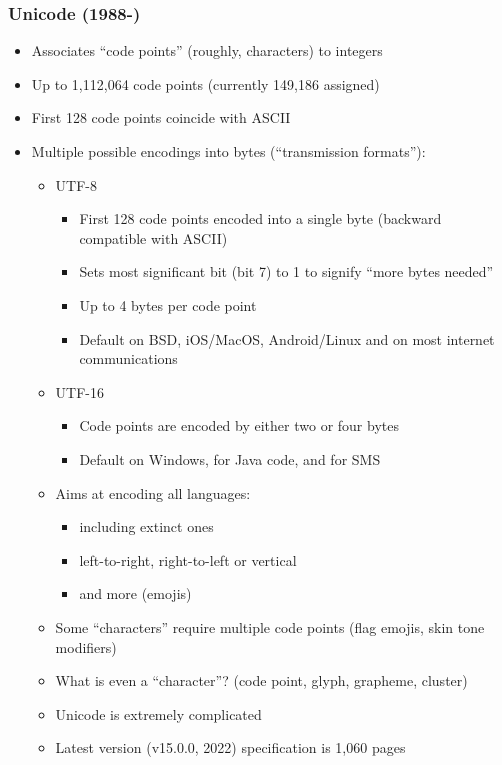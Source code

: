 \documentclass[12pt]{article}
\begin{document}
\subsubsection{Unicode (1988-)}
\begin{itemize}
    \item Associates ``code points'' (roughly, characters) to integers
    \item Up to 1,112,064 code points (currently 149,186 assigned)
    \item First 128 code points coincide with ASCII
    \item Multiple possible encodings into bytes (``transmission formats''):
    \begin{itemize}
        \item UTF-8
        \begin{itemize}
            \item First 128 code points encoded into a single byte (backward compatible with ASCII)
            \item Sets most significant bit (bit 7) to 1 to signify ``more bytes needed''
            \item Up to 4 bytes per code point
            \item Default on BSD, iOS/MacOS, Android/Linux and on most internet communications
        \end{itemize}
        \item UTF-16
        \begin{itemize}
            \item Code points are encoded by either two or four bytes
            \item Default on Windows, for Java code, and for SMS
        \end{itemize}
        \item Aims at encoding all languages:
        \begin{itemize}
            \item including extinct ones
            \item left-to-right, right-to-left or vertical
            \item and more (emojis)
        \end{itemize}
        \item Some ``characters'' require multiple code points (flag emojis, skin tone modifiers)
        \item What is even a ``character''? (code point, glyph, grapheme, cluster)
        \item Unicode is extremely complicated
        \item Latest version (v15.0.0, 2022) specification is 1,060 pages
    \end{itemize}
\end{itemize}
\end{document}
